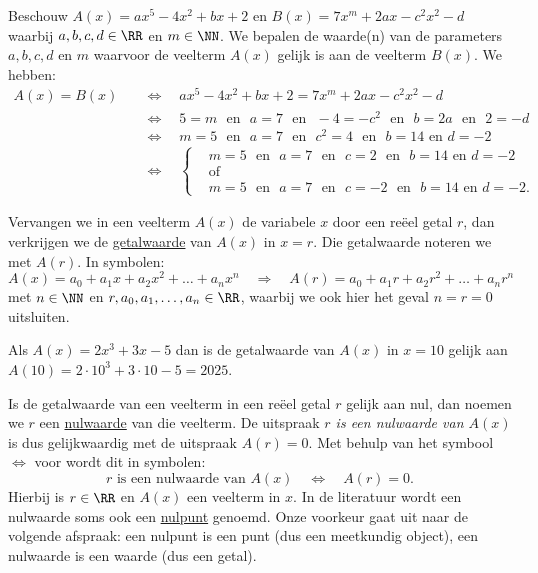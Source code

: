 \documentclass{ximera}
\begin{document}
\begin{example}
Beschouw $A(x) = ax^5 - 4x^2 + bx + 2$ en $B(x) = 7x^m + 2ax - c^2x^2 - d$ waarbij $a,b,c,d \in \RR$ en $m \in \NN$. We bepalen de waarde(n) van de parameters $a,b,c,d$ en $m$ waarvoor de veelterm $A(x)$ gelijk is aan de veelterm $B(x)$. We hebben: 
\begin{align*}
A(x) = B(x) \quad 
& \Leftrightarrow \quad ax^5 - 4x^2 + bx + 2 = 7x^m + 2ax - c^2x^2 - d \\
& \Leftrightarrow \quad 5 = m \,\,\text{ en }\,\, a = 7 \,\,\text{ en }\,\, -4 = -c^2 \,\,\text{ en }\,\, b = 2a \,\,\text{ en }\,\, 2 = -d \\
& \Leftrightarrow \quad m=5 \,\,\text{ en }\,\, a = 7 \,\,\text{ en }\,\, c^2 = 4 \,\,\text{ en }\,\, b = 14 \text{ en } d = -2 \\
& \Leftrightarrow \quad 
\left\{
\begin{aligned}
& m=5 \,\,\text{ en }\,\, a = 7 \,\,\text{ en }\,\, c = 2 \,\,\text{ en }\,\, b = 14 \text{ en } d = -2 \\
& \text{of} \\
& m=5 \,\,\text{ en }\,\, a = 7 \,\,\text{ en }\,\, c = -2 \,\,\text{ en }\,\, b = 14 \text{ en } d = -2.
\end{aligned}
\right.
\end{align*}
\end{example}

Vervangen we in een veelterm $A(x)$ de variabele $x$ door een re\"eel getal $r$, dan verkrijgen we de \underline{getalwaarde} van $A(x)$ in $x = r$. Die getalwaarde noteren we met $A(r)$. In symbolen:
\[
A(x) = a_0 + a_1x + a_2x^2 + \dots + a_n x^n \quad 
\Rightarrow
\quad A(r) = a_0 + a_1 r + a_2r^2 + \dots + a_n r^n
\]
met $n \in \NN$ en $r, a_0, a_1, \ldots, a_n \in \RR$, waarbij we ook hier het geval $n = r = 0$ uitsluiten. %

\begin{example}
Als $A(x) = 2x^3+3x-5$ dan is de getalwaarde van $A(x)$ in $x = 10$ gelijk aan $A(10) = 2\cdot 10^3 + 3 \cdot 10 - 5 = 2025$.
\end{example}

Is de getalwaarde van een veelterm in een re\"eel getal $r$ gelijk aan nul, dan noemen we $r$ een \underline{nulwaarde}  van die veelterm. De uitspraak {\em $r$ is een nulwaarde van $A(x)$} is dus gelijkwaardig met de uitspraak {\em $A(r) = 0$}. Met behulp van het symbool $\Leftrightarrow$ voor  wordt dit in symbolen:
\[
r \text{ is een nulwaarde van } A(x) \quad \Leftrightarrow \quad A(r) = 0.
\]
Hierbij is $r \in \RR$ en $A(x)$ een veelterm in $x$. In de literatuur wordt een nulwaarde soms ook een \underline{nulpunt} genoemd. Onze voorkeur gaat uit naar de volgende afspraak: een nulpunt is een punt (dus een meetkundig object), een nulwaarde is een waarde (dus een getal).
\end{document}
